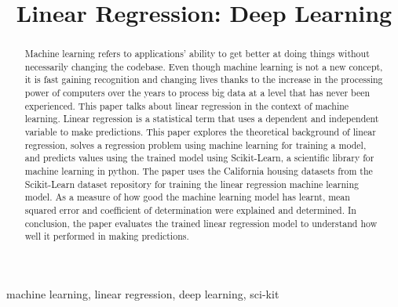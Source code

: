 \documentclass[conference]{IEEEtran}
\begin{document}
\title{Linear Regression: Deep Learning}

\author{
}

\maketitle

\begin{abstract}
Machine learning refers to applications' ability to get better at doing things without necessarily changing the codebase.
Even though machine learning is not a new concept, it is fast gaining recognition and changing lives thanks to the increase in the processing power of computers over the years to process big data at a level that has never been experienced. This paper talks about linear regression in the context of machine learning. Linear regression is a statistical term that uses a dependent and independent variable to make predictions. This paper explores the theoretical background of linear regression, solves a regression problem using machine learning for training a model, and predicts values using the trained model using Scikit-Learn, a scientific library for machine learning in python.
The paper uses the California housing datasets from the Scikit-Learn dataset repository for training the linear regression machine learning model. As a measure of how good the machine learning model has learnt, mean squared error and coefficient of determination were explained and determined. In conclusion, the paper evaluates the trained linear regression model to understand how well it performed in making predictions.
\end{abstract}
\begin{IEEEkeywords}
machine learning, linear regression, deep learning, sci-kit
\end{IEEEkeywords}
\end{document}
